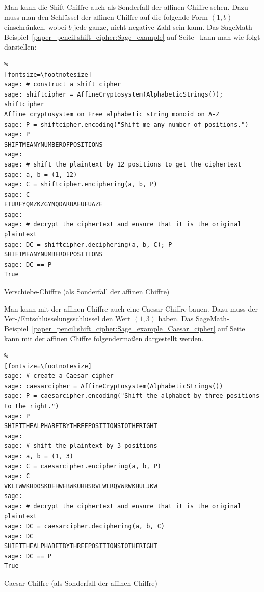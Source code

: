 \begin{refsegment}
Man kann  die Shift-Chiffre auch als Sonderfall der affinen Chiffre sehen.
Dazu muss man den Schlüssel der affinen Chiffre auf die folgende Form
$(1, b)$ einschränken, wobei $b$ jede ganze, nicht-negative Zahl sein kann.
Das SageMath-Beispiel~\ref{paper_pencil:shift_cipher:Sage_example} auf
Seite~\pageref{paper_pencil:shift_cipher:Sage_example} kann man
wie folgt darstellen:

\begin{sagecode}[h]
\begin{Verbatim}%
[fontsize=\footnotesize]
sage: # construct a shift cipher
sage: shiftcipher = AffineCryptosystem(AlphabeticStrings()); shiftcipher
Affine cryptosystem on Free alphabetic string monoid on A-Z
sage: P = shiftcipher.encoding("Shift me any number of positions.")
sage: P
SHIFTMEANYNUMBEROFPOSITIONS
sage:
sage: # shift the plaintext by 12 positions to get the ciphertext
sage: a, b = (1, 12)
sage: C = shiftcipher.enciphering(a, b, P)
sage: C
ETURFYQMZKZGYNQDARBAEUFUAZE
sage:
sage: # decrypt the ciphertext and ensure that it is the original plaintext
sage: DC = shiftcipher.deciphering(a, b, C); P
SHIFTMEANYNUMBEROFPOSITIONS
sage: DC == P
True
\end{Verbatim}
\caption{Verschiebe-Chiffre (als Sonderfall der affinen Chiffre)}
\end{sagecode}


Man kann mit der affinen Chiffre auch eine Caesar-Chiffre bauen. Dazu muss
der Ver-/Entschlüsselungsschlüssel den Wert $(1, 3)$ haben.
Das SageMath-Beispiel~\ref{paper_pencil:shift_cipher:Sage_example_Caesar_cipher}
auf Seite~\pageref{paper_pencil:shift_cipher:Sage_example_Caesar_cipher}
kann mit der affinen Chiffre folgendermaßen dargestellt werden.

\begin{sagecode}
\begin{Verbatim}%
[fontsize=\footnotesize]
sage: # create a Caesar cipher
sage: caesarcipher = AffineCryptosystem(AlphabeticStrings())
sage: P = caesarcipher.encoding("Shift the alphabet by three positions to the right.")
sage: P
SHIFTTHEALPHABETBYTHREEPOSITIONSTOTHERIGHT
sage:
sage: # shift the plaintext by 3 positions
sage: a, b = (1, 3)
sage: C = caesarcipher.enciphering(a, b, P)
sage: C
VKLIWWKHDOSKDEHWEBWKUHHSRVLWLRQVWRWKHULJKW
sage:
sage: # decrypt the ciphertext and ensure that it is the original plaintext
sage: DC = caesarcipher.deciphering(a, b, C)
sage: DC
SHIFTTHEALPHABETBYTHREEPOSITIONSTOTHERIGHT
sage: DC == P
True
\end{Verbatim}
\caption{Caesar-Chiffre (als Sonderfall der affinen Chiffre)}
\end{sagecode}




\end{refsegment}
